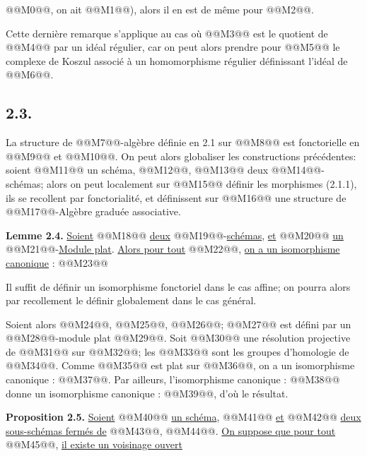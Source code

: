 
@@M0@@, on ait @@M1@@), alors il en est de même pour @@M2@@.

Cette dernière remarque s'applique au cas où @@M3@@ est le quotient de @@M4@@ par un idéal régulier, car on peut alors prendre pour @@M5@@ le complexe de Koszul associé à un homomorphisme régulier définissant l'idéal de @@M6@@.

\subsection*{2.3.}
La structure de @@M7@@-algèbre définie en 2.1 sur @@M8@@ est fonctorielle en @@M9@@ et @@M10@@. On peut alors globaliser les constructions précédentes: soient @@M11@@ un schéma, @@M12@@, @@M13@@ deux @@M14@@-schémas; alors on peut localement sur @@M15@@ définir les morphismes (2.1.1), ils se recollent par fonctorialité, et définissent sur @@M16@@ une structure de @@M17@@-Algèbre graduée associative.

\textbf{Lemme 2.4.} \uline{Soient} @@M18@@ \uline{deux} @@M19@@-\uline{schémas}, \uline{et} @@M20@@ \uline{un} @@M21@@-\uline{Module plat}. \uline{Alors pour tout} @@M22@@, \uline{on a un isomorphisme canonique} :
@@M23@@

Il suffit de définir un isomorphisme fonctoriel dans le cas affine; on pourra alors par recollement le définir globalement dans le cas général.

Soient alors @@M24@@, @@M25@@, @@M26@@; @@M27@@ est défini par un @@M28@@-module plat @@M29@@. Soit @@M30@@ une résolution projective de @@M31@@ sur @@M32@@; les @@M33@@ sont les groupes d'homologie de @@M34@@. Comme @@M35@@ est plat sur @@M36@@, on a un isomorphisme canonique : @@M37@@. Par ailleurs, l'isomorphisme canonique : @@M38@@ donne un isomorphisme canonique : @@M39@@, d'où le résultat.

\textbf{Proposition 2.5.} \uline{Soient} @@M40@@ \uline{un schéma}, @@M41@@ \uline{et} @@M42@@ \uline{deux sous-schémas fermés de} @@M43@@, @@M44@@. \uline{On suppose que pour tout} @@M45@@, \uline{il existe un voisinage ouvert}
